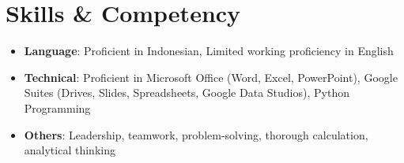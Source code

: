 \documentclass[letterpaper,10pt]{article}
\newcommand{\resumeItem}[1]{\item\small{#1}}
\newcommand{\resumeSubHeadingList}{\begin{itemize}[leftmargin=0.15in, label={}]}
\newcommand{\resumeSubHeadingListEnd}{\end{itemize}}
\begin{document}
\section{Skills \& Competency}
\resumeSubHeadingList
  \resumeItem{\textbf{Language}: Proficient in Indonesian, Limited working proficiency in English}
  \resumeItem{\textbf{Technical}: Proficient in Microsoft Office (Word, Excel, PowerPoint), Google Suites (Drives, Slides, Spreadsheets, Google Data Studios), Python Programming}
  \resumeItem{\textbf{Others}: Leadership, teamwork, problem-solving, thorough calculation, analytical thinking}
\resumeSubHeadingListEnd
\end{document}
